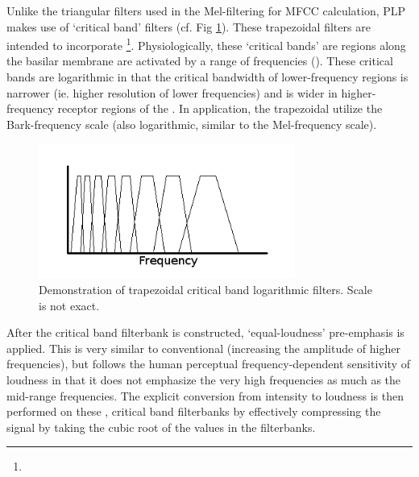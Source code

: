 Unlike the triangular filters used in the Mel-filtering for MFCC calculation, PLP makes use of `critical band' filters (cf. Fig \ref{fig:filt-cb}).  These trapezoidal filters are intended to incorporate \DIFdelbegin {}\DIFdelend \DIFaddbegin {}\footnote{}\DIFaddend . Physiologically, these `critical bands' are regions \DIFdelbegin {}\DIFdelend along the basilar membrane \DIFdelbegin {}\DIFdelend \DIFaddbegin {}\DIFaddend are activated by \DIFdelbegin \DIFdel{, }\DIFdelend \DIFaddbegin {}\DIFaddend a range of frequencies (\cite{fletcher:40}).  These critical bands are logarithmic in that the critical bandwidth of lower-frequency regions is narrower (ie. higher resolution of lower frequencies) and is wider in higher-frequency receptor regions of the \DIFdelbegin {}\DIFdelend \DIFaddbegin {}\DIFaddend .  In application, the trapezoidal \DIFdelbegin {}\DIFdelend \DIFaddbegin {}\DIFaddend utilize the Bark-frequency scale (also logarithmic, similar to the Mel-frequency scale).

\begin{figure}[h]
\centering
\includegraphics[width=0.75\textwidth]{figure/filt-cb.png}
\caption{Demonstration of trapezoidal critical band logarithmic filters. Scale is not exact.}\label{fig:filt-cb}
\end{figure}

After the critical band filterbank is constructed, `equal-loudness' pre-emphasis is applied.  This is very similar to conventional \DIFdelbegin {}\DIFdelend \DIFaddbegin {}\DIFaddend (increasing the amplitude of higher frequencies), but follows the human perceptual frequency-dependent sensitivity of loudness in that it does not emphasize the very high frequencies as much as the mid-range frequencies.%
The explicit conversion from intensity to loudness is then performed on these \DIFdelbegin {}\DIFdelend \DIFaddbegin {}\DIFaddend , critical band filterbanks by effectively compressing the signal by taking the cubic root of the values in the filterbanks.

